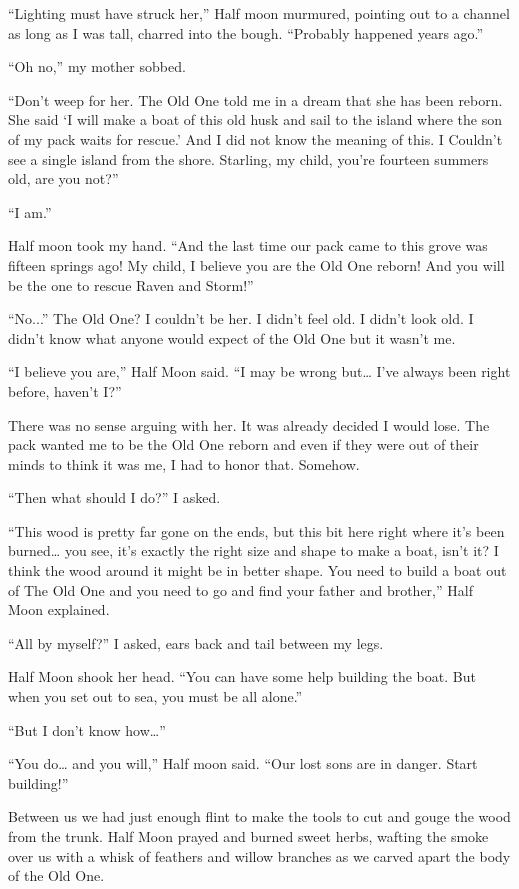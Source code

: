 ``Lighting must have struck her,'' Half moon murmured, pointing out to a channel as long as I was tall, charred into the bough. ``Probably happened years ago.''

``Oh no,'' my mother sobbed.

``Don't weep for her. The Old One told me in a dream that she has been reborn. She said `I will make a boat of this old husk and sail to the island where the son of my pack waits for rescue.' And I did not know the meaning of this. I Couldn't see a single island from the shore. Starling, my child, you're fourteen summers old, are you not?''

``I am.''

Half moon took my hand. ``And the last time our pack came to this grove was fifteen springs ago! My child, I believe you are the Old One reborn! And you will be the one to rescue Raven and Storm!''

``No...'' The Old One? I couldn't be her. I didn't feel old. I didn't look old. I didn't know what anyone would expect of the Old One but it wasn't me.

``I believe you are,'' Half Moon said. ``I may be wrong but\ldots{} I've always been right before, haven't I?''

There was no sense arguing with her. It was already decided I would lose. The pack wanted me to be the Old One reborn and even if they were out of their minds to think it was me, I had to honor that. Somehow.

``Then what should I do?'' I asked.

``This wood is pretty far gone on the ends, but this bit here right where it's been burned\ldots{} you see, it's exactly the right size and shape to make a boat, isn't it? I think the wood around it might be in better shape. You need to build a boat out of The Old One and you need to go and find your father and brother,'' Half Moon explained.

``All by myself?'' I asked, ears back and tail between my legs.

Half Moon shook her head. ``You can have some help building the boat. But when you set out to sea, you must be all alone.''

``But I don't know how\ldots''

``You do\ldots{} and you will,'' Half moon said. ``Our lost sons are in danger. Start building!''

\secdiv

Between us we had just enough flint to make the tools to cut and gouge the wood from the trunk. Half Moon prayed and burned sweet herbs, wafting the smoke over us with a whisk of feathers and willow branches as we carved apart the body of the Old One.

